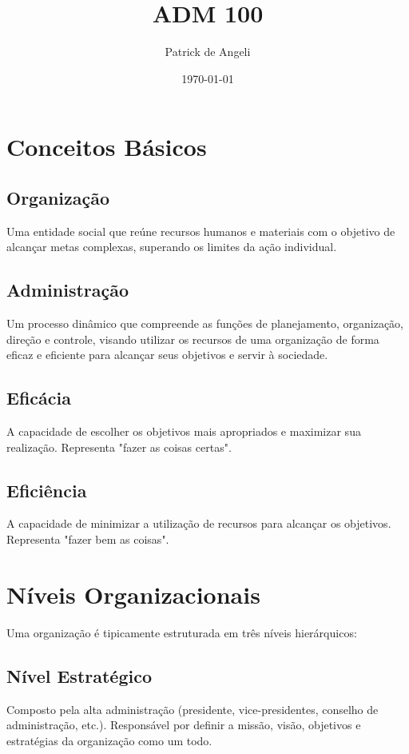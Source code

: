 \documentclass{article}
\title{ADM 100} %
\author{Patrick de Angeli} %
\date{\today} %
\begin{document}
\maketitle

\section{Conceitos Básicos}

\subsection{Organização}
Uma entidade social que reúne recursos humanos e materiais com o objetivo de alcançar metas complexas, superando os limites da ação individual.

\subsection{Administração}
Um processo dinâmico que compreende as funções de planejamento, organização, direção e controle, visando utilizar os recursos de uma organização de forma eficaz e eficiente para alcançar seus objetivos e servir à sociedade.

\subsection{Eficácia}
A capacidade de escolher os objetivos mais apropriados e maximizar sua realização. Representa "fazer as coisas certas".

\subsection{Eficiência}
A capacidade de minimizar a utilização de recursos para alcançar os objetivos. Representa "fazer bem as coisas".

\section{Níveis Organizacionais}

Uma organização é tipicamente estruturada em três níveis hierárquicos:

\subsection{Nível Estratégico}
Composto pela alta administração (presidente, vice-presidentes, conselho de administração, etc.). Responsável por definir a missão, visão, objetivos e estratégias da organização como um todo.
\end{document}
